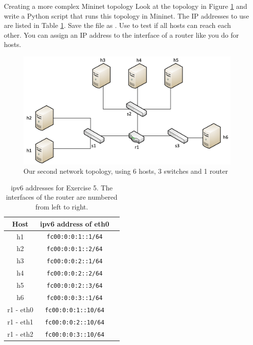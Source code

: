 \begin{exercise}{Creating a more complex Mininet topology}\label{ex:mininet_complex}
Look at the topology in Figure \ref{fig:mininet2} and write a Python script that runs this topology in Mininet. The IP addresses to use are listed in Table \ref{tab:lab1-ip-addresses}. Save the file as . Use  to test if all hosts can reach each other. You can assign an IP address to the interface of a router like you do for hosts.

\begin{figure}[ht]
	\centering
	\includegraphics[width=0.8\linewidth]{graphics/Lab0-Mininet2.png}	
	\caption{Our second network topology, using 6 hosts, 3 switches and 1 router}
	\label{fig:mininet2}
\end{figure}

\begin{table}[ht]
	\centering
	\begin{tabular}{| c | c | c |}	
		\hline
		\textbf{Host} & \textbf{\ac{ipv6} address of eth0}  \\ \hline
		h1 & \texttt{fc00:0:0:1::1/64} \\ 
		h2 & \texttt{fc00:0:0:1::2/64} \\
		h3 & \texttt{fc00:0:0:2::1/64} \\
		h4 & \texttt{fc00:0:0:2::2/64} \\
		h5 & \texttt{fc00:0:0:2::3/64} \\
		h6 & \texttt{fc00:0:0:3::1/64} \\
		\hline
		r1 - eth0 & \texttt{fc00:0:0:1::10/64} \\ 
		r1 - eth1 & \texttt{fc00:0:0:2::10/64} \\ 
		r1 - eth2 & \texttt{fc00:0:0:3::10/64} \\ 
		\hline
	\end{tabular}
	\caption{\ac{ipv6} addresses for Exercise 5. The interfaces of the router are numbered from left to right.}
	\label{tab:lab1-ip-addresses}
\end{table}
\end{exercise}

